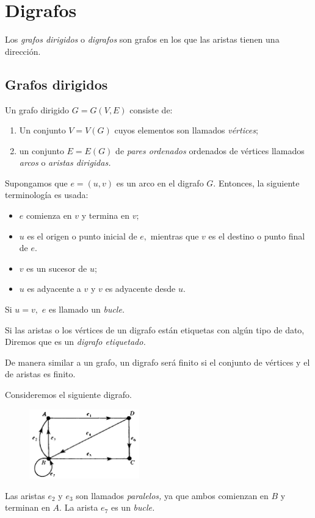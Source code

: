 \section{Digrafos}


Los \emph{grafos dirigidos} o \emph{digrafos} son grafos en los que las aristas tienen una dirección.


\subsection{Grafos dirigidos}


Un grafo dirigido $G=G(V,E)$ consiste de:
\begin{enumerate}
	\item Un conjunto $V=V(G)$ cuyos elementos son llamados \emph{v\'ertices};
	\item un conjunto $E=E(G)$ de \emph{pares ordenados} ordenados de v\'ertices llamados \emph{arcos} o \emph{aristas dirigidas.}
\end{enumerate}




Supongamos que $e=(u,v)$ es un arco en el digrafo $G.$ Entonces, la siguiente terminología es usada:
\begin{itemize}
	\item $e$ comienza en $v$ y termina en $v;$
	\item $u$ es el origen o punto inicial de $e,$ mientras que $v$ es el destino o punto final de $e.$
	\item $v$ es un sucesor de $u;$
	\item $u$ es adyacente a $v$ y $v$ es adyacente desde $u.$
\end{itemize}


Si $u=v,$ $e$ es llamado un \emph{bucle.}



Si las aristas o los v\'ertices de un digrafo están etiquetas con algún tipo de dato, Diremos que es un \emph{digrafo etiquetado.}


De manera similar a un grafo, un digrafo será finito si el conjunto de v\'ertices y el de aristas es finito.



\begin{problema}
	Consideremos el siguiente digrafo.
	\begin{figure}[h]
		\centering
		\includegraphics[height=3cm,keepaspectratio=true]{./md/fig0901a.png}
		\label{fig:0901a}
	\end{figure}
	Las aristas $e_{2}$ y $e_{3}$ son llamados \emph{paralelos,} ya que ambos comienzan en $B$ y terminan en $A.$ La arista $e_{7}$ es un \emph{bucle.}
\end{problema}




